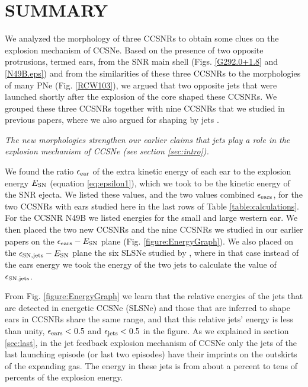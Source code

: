 \documentclass[12pt,preprint,a4paper]{aastex}
\begin{document}
\section{SUMMARY}
\label{sec:summary}

We analyzed the morphology of three CCSNRs to obtain some clues on the explosion mechanism of CCSNe. Based on the presence of two opposite protrusions, termed ears, from the SNR main shell (Figs. \ref{G292.0+1.8} and \ref{N49B.eps}) and from the similarities of these three CCSNRs to the morphologies of many PNe (Fig. \ref{RCW103}), we argued that two opposite jets that were launched shortly after the explosion of the core shaped these CCSNRs. We grouped these three CCSNRs together with nine CCSNRs that we studied in previous papers, where we also argued for shaping by jets \citep{GrichenerSoker2017, BearSoker2017}.   

\textit{The new morphologies strengthen our earlier claims that jets play a role in the explosion mechanism of CCSNe (see section \ref{sec:intro}).}

We found the ratio $\epsilon_{\rm ear}$ of the extra kinetic energy of each ear to the explosion energy $E_{\rm SN}$ (equation \ref{eq:epsilon1}), which we took to be the kinetic energy of the SNR ejecta. We listed these values, and the two values combined $\epsilon_{\rm ears}$, for the two CCSNRs with ears studied here in the last rows of Table \ref{table:calculations}. For the CCSNR N49B we listed energies for the small and large western ear. We then placed the two new CCSNRs and the nine CCSNRs we studied in our earlier papers on the $\epsilon_{\rm ears} - E_{\rm SN}$ plane (Fig. \ref{figure:EnergyGraph}).  
We also placed on the $\epsilon_{\rm SN, jets} - E_{\rm SN}$ plane the six SLSNe studied by \cite{Piranetal2017}, where in that case instead of the ears energy we took the energy of the two jets to calculate the value of $\epsilon_{\rm SN, jets}$.  

From Fig. \ref{figure:EnergyGraph} we learn that the relative energies of the jets that are detected in energetic CCSNe (SLSNe) and those that are inferred to shape ears in CCSNRs share the same range, and that this relative jets' energy is less than unity, $\epsilon_{\rm ears} < 0.5$ and $\epsilon_{\rm jets} < 0.5$ in the figure.   
 As we explained in section \ref{sec:last}, in the jet feedback explosion mechanism of CCSNe only the jets of the last launching episode (or last two episodes) have their imprints on the outskirts of the expanding gas. The energy in these jets is from about a percent to tens of percents of the explosion energy. 
 
\end{document}

